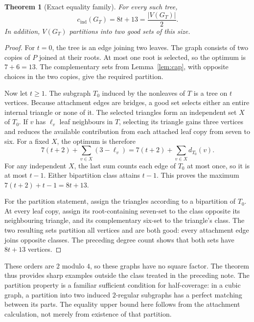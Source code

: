 \documentclass[11pt]{article}
\newtheorem{theorem}{Theorem}[section]
\newcommand{\cind}{c_{\mathrm{ind}}}
\begin{document}
\begin{theorem}[Exact equality family]\label{thm:trees}
For every such tree,
\[
 \cind(G_T)=8t+13=\frac{|V(G_T)|}{2}.
\]
In addition, $V(G_T)$ partitions into two good sets of this size.
\end{theorem}
\begin{proof}
For $t=0$, the tree is an edge joining two leaves. The graph consists
of two copies of $P$ joined at their roots. At most one root is
selected, so the optimum is $7+6=13$. The complementary sets from
Lemma~\ref{lem:cap}, with opposite choices in the two copies,
give the required partition.

Now let $t\geq1$. The subgraph $T_0$ induced by the nonleaves of $T$
is a tree on $t$ vertices. Because attachment edges are bridges,
a good set selects either an entire internal triangle or none of it.
The selected triangles form an independent set $X$ of $T_0$.
If $v$ has $\ell_v$ leaf neighbours in $T$, selecting its triangle
gains three vertices and reduces the available contribution from
each attached leaf copy from seven to six.
For a fixed $X$, the optimum is therefore
\[
 7(t+2)+\sum_{v\in X}(3-\ell_v)
   =7(t+2)+\sum_{v\in X}d_{T_0}(v).
\]
For any independent $X$, the last sum counts each edge of $T_0$
at most once, so it is at most $t-1$.
Either bipartition class attains $t-1$. This proves the maximum
$7(t+2)+t-1=8t+13$.

For the partition statement, assign the triangles according to a
bipartition of $T_0$. At every leaf copy, assign its root-containing
seven-set to the class opposite its neighbouring triangle, and its
complementary six-set to the triangle's class.
The two resulting sets partition all vertices and are both good:
every attachment edge joins opposite classes. The preceding degree
count shows that both sets have $8t+13$ vertices.
\end{proof}

These orders are $2$ modulo $4$, so these graphs have no square factor.
The theorem thus provides sharp examples outside the class treated
in the preceding note. The partition property is a familiar sufficient
condition for half-coverage: in a cubic graph, a partition into two
induced $2$-regular subgraphs has a perfect matching between its parts.
The equality upper bound here follows from the attachment calculation,
not merely from existence of that partition.
\end{document}
